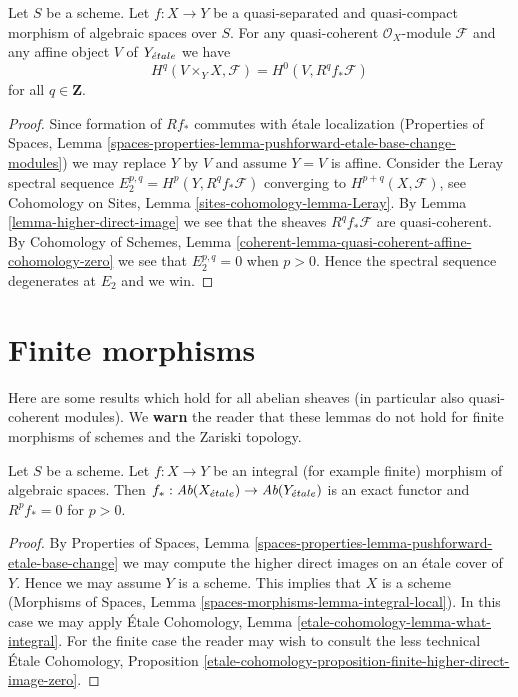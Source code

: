 \begin{lemma}
\label{lemma-quasi-coherence-higher-direct-images-application}
Let $S$ be a scheme. Let $f : X \to Y$ be a quasi-separated and quasi-compact
morphism of algebraic spaces over $S$. For any quasi-coherent
$\mathcal{O}_X$-module $\mathcal{F}$ and any affine object $V$ of
$Y_{\acute{e}tale}$ we have
$$
H^q(V \times_Y X, \mathcal{F}) = H^0(V, R^qf_*\mathcal{F})
$$
for all $q \in \mathbf{Z}$.
\end{lemma}

\begin{proof}
Since formation of $Rf_*$ commutes with \'etale localization
(Properties of Spaces, Lemma
\ref{spaces-properties-lemma-pushforward-etale-base-change-modules})
we may replace $Y$ by $V$ and assume $Y = V$ is affine.
Consider the Leray spectral sequence
$E_2^{p, q} = H^p(Y, R^qf_*\mathcal{F})$
converging to $H^{p + q}(X, \mathcal{F})$, see
Cohomology on Sites, Lemma \ref{sites-cohomology-lemma-Leray}.
By Lemma \ref{lemma-higher-direct-image}
we see that the sheaves $R^qf_*\mathcal{F}$ are quasi-coherent. By
Cohomology of Schemes, Lemma
\ref{coherent-lemma-quasi-coherent-affine-cohomology-zero}
we see that $E_2^{p, q} = 0$ when $p > 0$.
Hence the spectral sequence degenerates at $E_2$ and we win.
\end{proof}




\section{Finite morphisms}
\label{section-finite-morphisms}

\noindent
Here are some results which hold for all abelian sheaves
(in particular also quasi-coherent modules).
We {\bf warn} the reader that these lemmas do not hold for
finite morphisms of schemes and the Zariski topology.

\begin{lemma}
\label{lemma-finite-higher-direct-image-zero}
Let $S$ be a scheme. Let $f : X \to Y$ be an integral (for example finite)
morphism of algebraic spaces. Then
$f_* : \textit{Ab}(X_{\acute{e}tale}) \to \textit{Ab}(Y_{\acute{e}tale})$
is an exact functor and $R^pf_* = 0$ for $p > 0$.
\end{lemma}

\begin{proof}
By Properties of Spaces, Lemma
\ref{spaces-properties-lemma-pushforward-etale-base-change}
we may compute the higher direct images on an \'etale cover of $Y$.
Hence we may assume $Y$ is a scheme. This implies that
$X$ is a scheme (Morphisms of Spaces, Lemma
\ref{spaces-morphisms-lemma-integral-local}).
In this case we may apply
\'Etale Cohomology, Lemma \ref{etale-cohomology-lemma-what-integral}.
For the finite case the reader may wish to consult the less technical
\'Etale Cohomology, Proposition
\ref{etale-cohomology-proposition-finite-higher-direct-image-zero}.
\end{proof}

